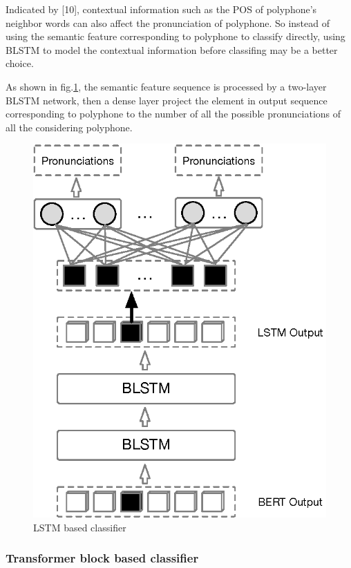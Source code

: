 \documentclass[a4paper]{article}
\begin{document}
Indicated by [10], contextual information such as the POS of polyphone's neighbor words can also affect the pronunciation of polyphone. So instead of using the semantic feature corresponding to polyphone to classify directly, using BLSTM to model the contextual information before classifing may be a better choice.

As shown in fig.\ref{fig:lstm}, the semantic feature sequence is processed by a two-layer BLSTM network, then a dense layer project the element in output sequence corresponding to polyphone to the number of all the possible pronunciations of all the considering polyphone.

\begin{figure}[t]
	\centering
	\includegraphics[scale=0.5]{pics/lstm2.eps}
	\caption{LSTM based classifier}
	\label{fig:lstm}
\end{figure}

\subsubsection{Transformer block based classifier}
\end{document}
